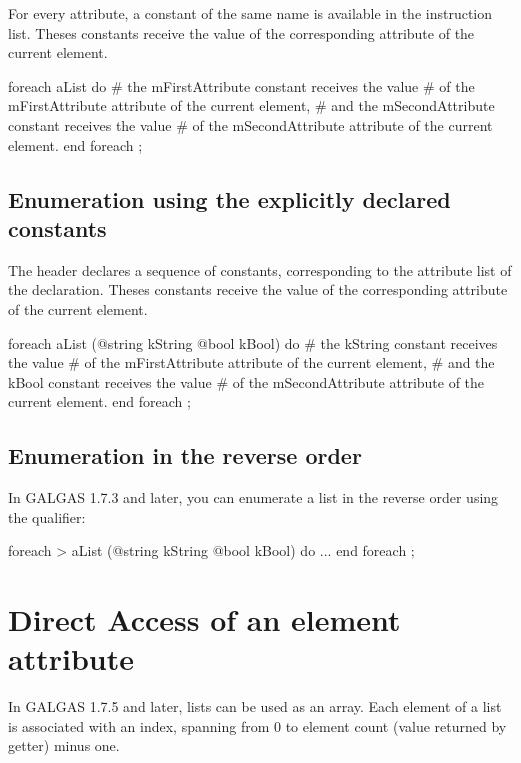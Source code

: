 For every attribute, a constant of the same name is available in the  instruction list. Theses constants receive the value of the corresponding attribute of the current element.

\begin{galgascode}
foreach aList do
  # the mFirstAttribute constant receives the value
  # of the mFirstAttribute attribute of the current element,
  # and the mSecondAttribute constant receives the value
  # of the mSecondAttribute attribute of the current element.
end foreach ;
\end{galgascode}

\subsection{Enumeration using the explicitly declared constants}

The  header declares a sequence of constants, corresponding to the attribute list of the  declaration. Theses constants receive the value of the corresponding attribute of the current element.


\begin{galgascode}
foreach aList (@string kString @bool kBool) do
  # the kString constant receives the value
  # of the mFirstAttribute attribute of the current element,
  # and the kBool constant receives the value
  # of the mSecondAttribute attribute of the current element.
end foreach ;
\end{galgascode}

\subsection{Enumeration in the reverse order}

In GALGAS 1.7.3 and later, you can enumerate a list in the reverse order using the \galgas{>} qualifier:

\begin{galgascode}
foreach > aList (@string kString @bool kBool) do
  ...
end foreach ;
\end{galgascode}




\section{Direct Access of an element attribute}

In GALGAS 1.7.5 and later, lists can be used as an array. Each element of a list is associated with an  index, spanning from 0 to element count (value returned by  getter) minus one.

